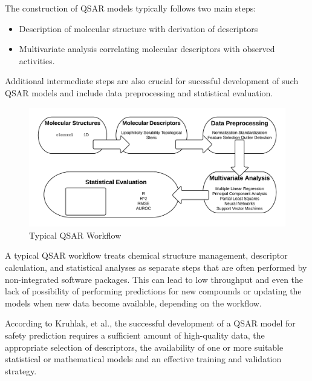 The construction of QSAR models typically follows two main steps:
\begin{itemize}
\item Description of molecular structure with derivation of descriptors
\item Multivariate analysis correlating molecular descriptors with observed activities. 
\end{itemize}
Additional intermediate steps are also crucial for sucessful development of such QSAR models and include data preprocessing and statistical evaluation. \cite{Nantasenamat2009}

\begin{figure}[h,t]
  \caption{Typical QSAR Workflow}
  \centering
   \includegraphics[width=1\textwidth]{../img/Typical_QSAR_Process.png}
\end{figure}

A typical QSAR workflow treats chemical structure management, descriptor calculation, and statistical analyses as separate steps that are often performed by non-integrated software packages. This can lead to low throughput and even the lack of possibility of performing predictions for new compounds or updating the models when new data become available, depending on the workflow.

According to Kruhlak, et al., the successful development of a QSAR model for safety prediction requires a sufficient amount of high-quality data, the appropriate selection of descriptors, the availability of one or more suitable statistical or mathematical models and an effective training and validation strategy.
\cite{Kruhlak2012}

